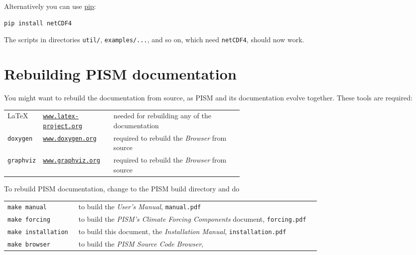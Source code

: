 \documentclass[titlepage,letterpaper,final]{scrartcl}
\begin{document}
Alternatively you can use \href{https://pip.pypa.io/en/stable/}{pip}:
\begin{verbatim}
pip install netCDF4
\end{verbatim}

The scripts in directories \texttt{util/}, \texttt{examples/...}, and so on,
which need \texttt{netCDF4}, should now work.

\section{Rebuilding PISM documentation}
\label{sec:docs}

You might want to rebuild the documentation from source, as PISM and its
documentation evolve together. These tools are required: \bigskip
\begin{center}
  \begin{tabular*}{0.9\linewidth}{llp{0.55\linewidth}}
    \toprule
    \LaTeX & \href{http://www.latex-project.org/}{\texttt{www.latex-project.org}} &  needed for rebuilding any of the documentation \\
    \texttt{doxygen}\index{doxygen} & \href{http://www.stack.nl/~dimitri/doxygen/}{\texttt{www.doxygen.org}} &  required to rebuild the \emph{Browser} from source  \\
    \texttt{graphviz}\index{graphviz} & \href{http://www.graphviz.org/}{\texttt{www.graphviz.org}} & required to rebuild the \emph{Browser} from source  \\
    \bottomrule
  \end{tabular*}
\end{center}
\bigskip
\noindent To rebuild PISM documentation, change to the PISM build directory and do
\begin{center}
  \begin{tabular}{p{0.22\linewidth}p{0.75\linewidth}}
    \texttt{make manual} & to build the \emph{User's Manual}, \texttt{manual.pdf}\\
    \texttt{make forcing} & to build the \emph{PISM's Climate Forcing
      Components} document, \texttt{forcing.pdf} \\
    \texttt{make installation} & to build this document, the \emph{Installation Manual}, \texttt{installation.pdf}\\
    \texttt{make browser} & to build the \emph{PISM Source Code Browser},\\
  \end{tabular}
\end{center}
\bigskip
\end{document}
